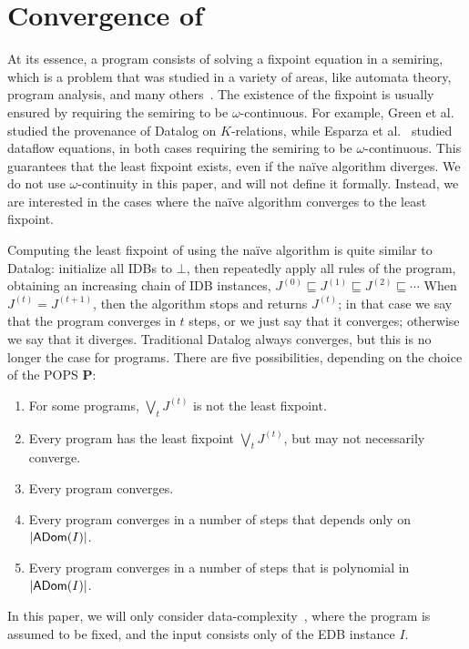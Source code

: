 \section{Convergence of \datalogo}
\label{sec:convergence}

At its essence, a \datalogo program consists of solving a fixpoint
equation in a semiring, which is a problem that was studied in a variety
of areas, like automata theory, program analysis, and many
others~\cite{MR1470001,DBLP:conf/popl/CousotC77,MR1728440,MR1059930,
  DBLP:conf/lics/HopkinsK99, DBLP:journals/tcs/Lehmann77,
  semiring_book,MR609751}.  The existence of the fixpoint is usually
ensured by requiring the semiring to be $\omega$-continuous. For
example, Green et al.~\cite{DBLP:conf/pods/GreenKT07} studied the
provenance of Datalog on $K$-relations, while Esparza et
al.~\cite{DBLP:journals/jacm/EsparzaKL10} studied dataflow equations,
in both cases requiring the semiring to be $\omega$-continuous.  This
guarantees that the least fixpoint exists, even if the na\"ive algorithm
diverges.
We do not use $\omega$-continuity in this paper,
 and will not define it formally.
Instead, we are interested in the cases 
 where the na\"ive algorithm converges to the least fixpoint.

Computing the least fixpoint of \datalogo using the na\"ive algorithm
 is quite similar to Datalog:
initialize all IDBs to $\bot$,
then repeatedly apply all rules of the \datalogo program, obtaining an
increasing chain of IDB instances,
$J^{(0)} \sqsubseteq J^{(1)} \sqsubseteq J^{(2)} \sqsubseteq \cdots$
When $J^{(t)} = J^{(t+1)}$, then the algorithm stops and returns
$J^{(t)}$; in that case we say that the \datalogo program converges in
$t$ steps, or we just say that it converges; otherwise we say that it
diverges.  Traditional Datalog always converges, but this is no longer
the case for \datalogo programs.  There are five possibilities,
depending on the choice of the POPS $\bm P$:
%
\begin{enumerate}[label=(\roman*)]
\item \label{item:converge:1} For some \datalogo programs, $\bigvee_t J^{(t)}$ is not the least fixpoint.
\item \label{item:converge:2} Every \datalogo program has the least fixpoint $\bigvee_t J^{(t)}$, but may not necessarily converge.
\item \label{item:converge:3} Every \datalogo program converges.
\item \label{item:converge:4} Every \datalogo program converges in a
  number of steps that depends only on $|\textsf{ADom}(I)|$.
\item \label{item:converge:5} Every \datalogo program converges in a
  number of steps that is polynomial in $|\textsf{ADom}(I)|$.
\end{enumerate}
%
In this paper, we will only consider
data-complexity~\cite{DBLP:conf/stoc/Vardi82}, where the \datalogo
program is assumed to be fixed, and the input consists only of the EDB
instance $I$.


